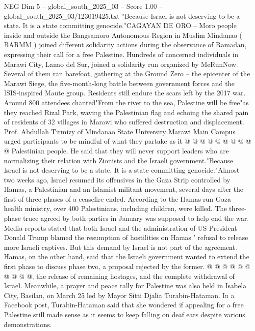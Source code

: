 \begin{textsample}{NEG Dim 5 – global\_south\_2025\_03 – Score 1.00 – global\_south\_2025\_03/123019425.txt}  \label{ex:f5_neg_276}
"Because Israel is not deserving to be a state.
It is a state committing genocide."CAGAYAN DE ORO -- Moro people inside and outside the Bangsamoro Autonomous Region in Muslim Mindanao ( BARMM ) joined different solidarity actions during the observance of Ramadan, expressing their call for a free Palestine.
Hundreds of concerned individuals in Marawi City, Lanao del Sur, joined a solidarity run organized by MeRunNow.
Several of them ran barefoot, gathering at the Ground Zero -- the epicenter of the Marawi Siege, the five-month-long battle between government forces and the ISIS-inspired Maute group.
Residents still endure the scars left by the 2017 war.
Around 800 attendees chanted"From the river to the sea, Palestine will be free"as they reached Rizal Park, waving the Palestinian flag and echoing the shared pain of residents of 32 villages in Marawi who suffered destruction and displacement.
Prof.
Abdullah Tirmizy of Mindanao State University Marawi Main Campus urged participants to be mindful of what they partake as it @ @ @ @ @ @ @ @ @ @ Palestinian people.
He said that they will never support leaders who are normalizing their relation with Zionists and the Israeli government."Because Israel is not deserving to be a state.
It is a state committing genocide."Almost two weeks ago, Israel resumed its offensives in the Gaza Strip controlled by Hamas, a Palestinian and an Islamist militant movement, several days after the first of three phases of a ceasefire ended.
According to the Hamas-run Gaza health ministry, over 400 Palestinians, including children, were killed.
The three-phase truce agreed by both parties in January was supposed to help end the war.
Media reports stated that both Israel and the administration of US President Donald Trump blamed the resumption of hostilities on Hamas ' refusal to release more Israeli captives.
But this demand by Israel is not part of the agreement.
Hamas, on the other hand, said that the Israeli government wanted to extend the first phase to discuss phase two, a proposal rejected by the former. @ @ @ @ @ @ @ @ @ @, the release of remaining hostages, and the complete withdrawal of Israel.
Meanwhile, a prayer and peace rally for Palestine was also held in Isabela City, Basilan, on March 25 led by Mayor Sitti Djalia Turabin-Hataman.
In a Facebook post, Turabin-Hataman said that she wondered if appealing for a free Palestine still made sense as it seems to keep falling on deaf ears despite various demonstrations.

\end{textsample}

